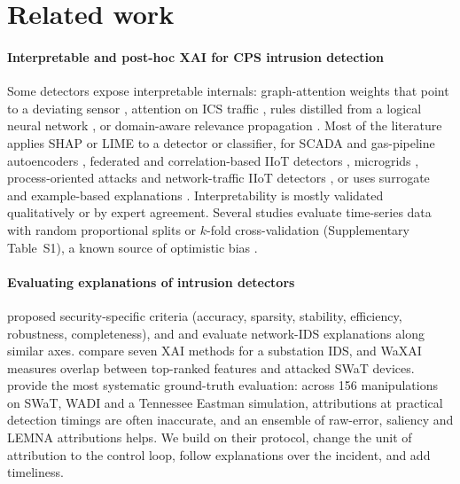 \section{Related work}\label{sec:related}

\paragraph{Interpretable and post-hoc XAI for CPS intrusion detection}
Some detectors expose interpretable internals: graph-attention weights that point to a deviating sensor \citep{deng2021gdn,tang2023grn}, attention on ICS traffic \citep{eltomy2024icps}, rules distilled from a logical neural network \citep{xu2024alrl}, or domain-aware relevance propagation \citep{rasheed2026xaicps}. Most of the literature applies SHAP or LIME to a detector or classifier, for SCADA and gas-pipeline autoencoders \citep{huong2022fedex,ha2022ifac}, federated and correlation-based IIoT detectors \citep{yazdinejad2025ppfl,birihanu2024correlation,abudurexiti2025cctak}, microgrids \citep{trivedi2025microgrid}, process-oriented attacks \citep{kenmogne2024netsoft,kenmogne2025intellisec} and network-traffic IIoT detectors \citep{oseni2023its,khan2022iiot,shoukat2025trustmyids,alani2023e2i3ds,attique2024iiot,ahakonye2024iotm,saiyed2026eshield}, or uses surrogate and example-based explanations \citep{zolanvari2023trust,panesar2026mmdcritic}. Interpretability is mostly validated qualitatively or by expert agreement. Several studies evaluate time-series data with random proportional splits or $k$-fold cross-validation (Supplementary Table~S1), a known source of optimistic bias \citep{arp2022dos,kaufman2012leakage}.

\paragraph{Evaluating explanations of intrusion detectors}
\citet{warnecke2020evaluating} proposed security-specific criteria (accuracy, sparsity, stability, efficiency, robustness, completeness), and \citet{wei2023xnids} and \citet{arreche2024exai} evaluate network-IDS explanations along similar axes. \citet{oinonen2026substations} compare seven XAI methods for a substation IDS, and WaXAI \citep{mathuros2024waxai} measures overlap between top-ranked features and attacked SWaT devices. \citet{fung2024attributions} provide the most systematic ground-truth evaluation: across 156 manipulations on SWaT, WADI and a Tennessee Eastman simulation, attributions at practical detection timings are often inaccurate, and an ensemble of raw-error, saliency and LEMNA \citep{guo2018lemna} attributions helps. We build on their protocol, change the unit of attribution to the control loop, follow explanations over the incident, and add timeliness.

